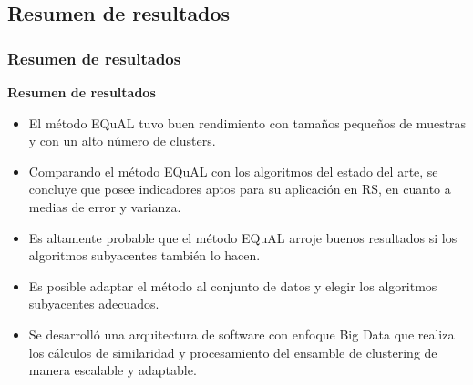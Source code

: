 \subsection{Resumen de resultados}
\begin{frame}
	\frametitle{Resumen de resultados}
	\textbf{Resumen de resultados}
	\bigskip
	\begin{itemize}
		\item El método EQuAL tuvo buen rendimiento con tamaños pequeños de muestras y con un alto número de clusters.
		\item Comparando el método EQuAL con los algoritmos del estado del arte, se concluye que posee indicadores aptos para su aplicación en RS, en cuanto a medias de error y varianza.
		\item Es altamente probable que el método EQuAL arroje buenos resultados si los algoritmos subyacentes también lo hacen.
		\item Es posible adaptar el método al conjunto de datos y elegir los algoritmos subyacentes adecuados.
		\item Se desarrolló una arquitectura de software con enfoque Big Data que realiza los cálculos de similaridad y procesamiento del ensamble de clustering de manera escalable y adaptable.
	\end{itemize}
\end{frame}